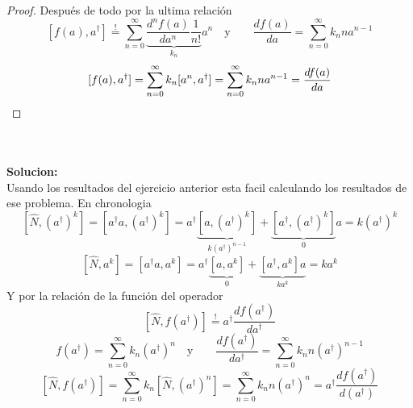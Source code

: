 \begin{proof}
Después de todo por la ultima relación
$$
	[f(a), a^\dagger] \overset{!}{=} \sum_{n=0}^\infty \underbrace{\frac{d^n
f(a)}{d a^n} \frac{1}{n!}}_{k_n} a^n \quad \text{y} \qquad \frac{d f(a)}{da} =
\sum_{n=0}^\infty k_n n a^{n-1}
$$
$$
	[f(a), a^\dagger] = \sum_{n=0}^\infty k_n [a^n, a^\dagger] =
\sum_{n=0}^\infty k_n n a^{n-1} = \frac{d f(a)}{da} \qedhere
$$
\end{proof}

\\\\
\textbf{Solucion:}\\
Usando los resultados del ejercicio anterior esta facil calculando los
resultados de ese problema. En chronologia
$$
	[\hat N, (a^\dagger)^k] = [a^\dagger a, (a^\dagger)^k] = a^\dagger
\underbrace{[a, (a^\dagger)^k]}_{k (a^\dagger)^{n-1}} + \underbrace{[a^\dagger,
(a^\dagger)^k ]}_{0} a = k (a^\dagger)^k
$$
$$
	[\hat N, a^k] = [a^\dagger a, a^k] = a^\dagger \underbrace{[a, a^k]}_0 +
\underbrace{[a^\dagger, a^k] a}_{ka^k} = k a^k
$$
Y por la relación de la función del operador
$$
	[\hat N, f(a^\dagger)] \overset{!}{=} a^\dagger \frac{d f(a^\dagger)}{d
a^\dagger}
$$
$$
	f(a^\dagger) = \sum_{n=0}^\infty k_n (a^\dagger)^n \quad \text{y} \qquad
\frac{d f(a^\dagger)}{d a^\dagger} = \sum_{n=0}^\infty k_n n (a^\dagger)^{n-1}
$$
$$
	[\hat N, f(a^\dagger)] = \sum_{n=0}^\infty k_n [\hat N, (a^\dagger)^n] =
\sum_{n=0}^\infty k_n n (a^\dagger)^n = a^\dagger \frac{d f(a^\dagger)}{d
(a^\dagger)}
$$

